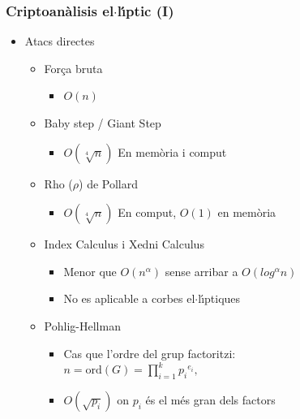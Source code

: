 \documentclass{beamer}
\def\lgem{l\ensuremath{\cdot}l}
\def\ces{corbes e\lgem{}\'{\i}ptiques}%
\theoremstyle{saltolinea}   			%
\begin{document}
\begin{frame}
  \frametitle{Criptoan\`alisis el$\cdot$l\'{\i}ptic (I)}
  \begin{itemize}
    \item<1-> Atacs directes
    \begin{itemize}
      \item<2-> For\c{c}a bruta
      \begin{itemize}
        \item<2-> $O\left(n\right)$
      \end{itemize}
      \item<3-> Baby step / Giant Step
      \begin{itemize}
        \item<3-> $O\left(\sqrt[4]{n}\right)$ En mem\`oria i comput
      \end{itemize}
      \item<4-> Rho ($\rho$) de Pollard
      \begin{itemize}
        \item<4-> $O\left(\sqrt[4]{n}\right)$ En comput, $O\left(1\right)$ en mem\`oria
      \end{itemize}
      \item<5-> Index Calculus i Xedni Calculus
      \begin{itemize}
        \item<5-> Menor que $O\left(n^\alpha\right)$ sense arribar a $O\left(log^{\alpha}n\right)$
        \item<6-> No es aplicable a \ces
      \end{itemize}
      \item<7-> Pohlig-Hellman
      \begin{itemize}
        \item<8-> Cas que l'ordre del grup factoritzi: \\
         $n = \mathrm{ord}(G)= \prod_{i=1}^{k} {p_{i}}^{e_{i}},$
        \item<8-> $O\left(\sqrt{p_{i}}\right)$ on $p_{i}$ \'es el m\'es gran dels factors
      \end{itemize}
    \end{itemize}
  \end{itemize}
\end{frame}
\end{document}
